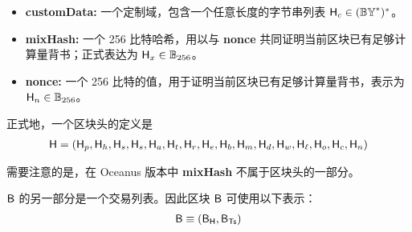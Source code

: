 \begin{itemize}[nosep]
	\item {\bf customData:} 一个定制域，包含一个任意长度的字节串列表 $\textsf{H}_c\in (\mathbb{BY}^*)^*$。

	\item {\bf mixHash:} 一个 256 比特哈希，用以与 {\bf nonce} 共同证明当前区块已有足够计算量背书；正式表达为 $\textsf{H}_x\in\mathbb{B}_{256}$。

	\item {\bf nonce:} 一个 256 比特的值，用于证明当前区块已有足够计算量背书，表示为 $\textsf{H}_n\in\mathbb{B}_{256}$。


\end{itemize}

正式地，一个区块头的定义是
%
\begin{align}
	\textsf{H} = (\textsf{H}_p,\textsf{H}_h,\textsf{H}_s,\textsf{H}_s,\textsf{H}_a,\textsf{H}_t,\textsf{H}_r,\textsf{H}_e,\textsf{H}_b,\textsf{H}_m,\textsf{H}_d,\textsf{H}_w,\textsf{H}_\ell,\textsf{H}_o,\textsf{H}_c,\textsf{H}_n)
\end{align}

需要注意的是，在 Oceanus 版本中 {\bf mixHash} 不属于区块头的一部分。

$\textsf{B}$ 的另一部分是一个交易列表。因此区块 $\textsf{B}$ 可使用以下表示：  
\begin{align}
	\textsf{B}\equiv \left(\textsf{B}_{\textsf{H}}, \textsf{B}_{\textsf{Ts}} \right)
\end{align}


